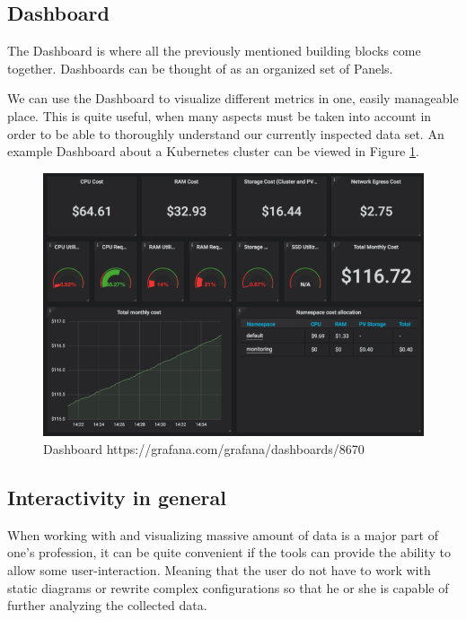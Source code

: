 \subsection{Dashboard}
The Dashboard is where all the previously mentioned building blocks come together. Dashboards can be thought of as an organized set of Panels.

We can use the Dashboard to visualize different metrics in one, easily manageable place. This is quite useful, when many aspects must be taken into account in order to be able to thoroughly understand our currently inspected data set. An example Dashboard about a Kubernetes cluster can be viewed in Figure \ref{fig:dashboard}.


\begin{figure}[H]
	\centering
	\includegraphics[width=130mm, keepaspectratio]{figures/dashboard-small.png}
	\caption{Dashboard https://grafana.com/grafana/dashboards/8670}
	\label{fig:dashboard}
\end{figure}

\subsection{Interactivity in general}
When working with and visualizing massive amount of data is a major part of one's profession, it can be quite convenient if the tools can provide the ability to allow some user-interaction. Meaning that the user do not have to work with static diagrams or rewrite complex configurations so that he or she is capable of further analyzing the collected data.

